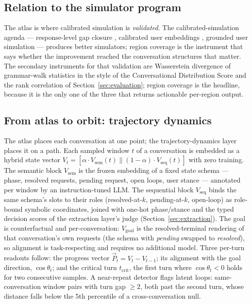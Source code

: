 \subsection{Relation to the simulator program}
The atlas is where calibrated simulation is \emph{validated}.
The calibrated-simulation agenda --- response-level gap closure
\citep{distributionalGap2026}, calibrated user embeddings \citep{cue2026}, grounded user
simulation \citep{realUserSim2026} --- produces better simulators; region coverage is the
instrument that says whether the improvement reached the conversation structures that matter.
The secondary instruments for that validation are Wasserstein divergence of grammar-walk
statistics in the style of the Conversational Distribution Score \citep{cds2026} and the rank
correlation of Section~\ref{sec:evaluation}; region coverage is the headline, because it is
the only one of the three that returns actionable per-region output.

\subsection{From atlas to orbit: trajectory dynamics}
\label{sec:orbit}
The atlas places each conversation at one point; the trajectory-dynamics layer places it on
a path.
Each sampled window $t$ of a conversation is embedded as a hybrid state vector
$V_t = [\alpha \cdot V_{\mathrm{sem}}(t) \parallel (1-\alpha) \cdot V_{\mathrm{seq}}(t)]$
with zero training.
The semantic block $V_{\mathrm{sem}}$ is the frozen embedding of a fixed state schema ---
phase, resolved requests, pending request, open loops, user stance --- annotated per window
by an instruction-tuned LLM.
The sequential block $V_{\mathrm{seq}}$ binds the same schema's slots to their roles
(resolved-at-$k$, pending-at-$k$, open-loop) as role-bound symbolic coordinates, joined with
one-hot phase/stance and the typed decision scores of the extraction layer's judge
(Section~\ref{sec:extraction}).
The goal is counterfactual and per-conversation: $V_{\mathrm{goal}}$ is the
resolved-terminal rendering of that conversation's own requests (the schema with
\emph{pending} swapped to \emph{resolved}), so alignment is task-respecting and requires no
additional model.
Three per-turn readouts follow: the progress vector $\vec P_t = V_t - V_{t-1}$; its alignment
with the goal direction, $\cos\theta_t$; and the critical turn $t_{\mathrm{crit}}$, the
first turn where $\cos\theta_t < 0$ holds for two consecutive samples.
A near-repeat detector flags latent loops: same-conversation window pairs with turn gap
$\ge 2$, both past the second turn, whose distance falls below the 5th percentile of a
cross-conversation null.

